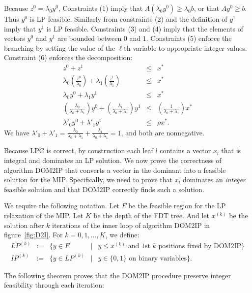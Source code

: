 \documentclass[11pt]{article}
\begin{document}
Because $z^0 = \lambda_0y^0$, Constraints (1) imply that $A(\lambda_0y^0) \ge \lambda_0b$,
or that $Ay^0 \ge b$.  Thus $y^0$ is LP feasible.  Similarly from constraints (2) and the
definition of $y^1$ imply that $y^1$ is LP feasible.  Constraints (3) and (4) imply that
the elements of vectors $y^0$ and $y^1$ are bounded between $0$ and $1$.  Constraints
(5) enforce the branching by setting the value of the $\ell$th variable to appropriate integer
values.  Constraint (6) enforces the decomposition:
\begin{eqnarray*}
z^0 + z^1 & \le & x^*\\
\lambda_0\left(\frac{z^0}{\lambda_0}\right) + \lambda_1\left(\frac{z^1}{\lambda_1}\right) & \le & x^*\\
\lambda_0y^0 + \lambda_1y^1 & \le & x^*\\
\left(\frac{\lambda_0}{\lambda_0 + \lambda_1}\right)y^0 + \left(\frac{\lambda_1}{\lambda_0 + \lambda_1}\right)y^1 & \le & 
       \left(\frac{1}{\lambda_0 + \lambda_1}\right)x^*\\
\lambda'_0 y^0 + \lambda'_1 y^1 & \le & \rho x^*.
\end{eqnarray*}
We have $\lambda'_0 + \lambda'_1 = \frac{\lambda_0}{\lambda_0 + \lambda_1} + \frac{\lambda_1}{\lambda_0 + \lambda_1} = 1$,
and both are nonnegative.

Because LPC is correct, by construction each leaf $l$ contains a
vector $x_l$ that is integral and dominates an LP solution.  We now
prove the correctness of algorithm DOM2IP that converts a vector in
the dominant into a feasible solution for the MIP.  Specifically, we
need to prove that $x_l$ dominates an {\em integer} feasible solution
and that DOM2IP correctly finds such a solution.

We require the following notation.  Let $F$ be the feasible region for the
LP relaxation of the MIP.  Let $K$ be the depth of the FDT tree.  And let
$x^{(k)}$ be the solution after $k$ iterations of the inner loop of algorithm
DOM2IP in figure~\ref{fig:D2I}. For $k=0,1,\ldots, K$, we define:
\begin{displaymath}
\begin{array}{llllll}
LP^{(k)} &:=& \{y \in F & | & y\leq x^{(k)}\mbox{ and 1st $k$ positions 
fixed by DOM2IP}\} \\
IP^{(k)} &:=& \{y\in LP^{(k)} & | & y\in \{0,1\}\mbox{ on binary variables}\}.
\end{array}
\end{displaymath}

The following theorem proves that the DOM2IP procedure preserve integer feasibility
through each iteration:
\end{document}
